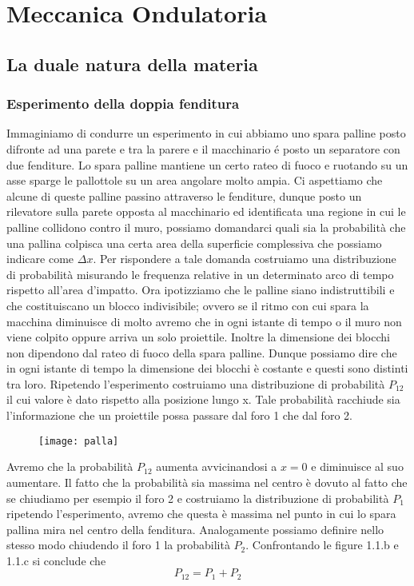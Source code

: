 \setcounter{chapter}{0}
\chapter{Meccanica Ondulatoria}
\section{La duale natura della materia}

\subsection{Esperimento della doppia fenditura}
Immaginiamo di condurre un esperimento in cui abbiamo uno spara palline posto difronte ad una parete e tra la parere e il macchinario \'e posto un separatore con due fenditure. Lo spara palline mantiene un certo rateo di fuoco e ruotando su un asse sparge le pallottole su un area angolare molto ampia. Ci aspettiamo che alcune di queste palline passino attraverso le fenditure, dunque posto un rilevatore sulla parete opposta al macchinario ed identificata una regione in cui le palline collidono contro il muro, possiamo domandarci quali sia la probabilit\`a che una pallina colpisca una certa area della superficie complessiva che possiamo indicare come $\Delta x$. Per rispondere a tale domanda costruiamo una distribuzione di probabilit\`a misurando le frequenza relative in un determinato arco di tempo rispetto all'area d'impatto. Ora ipotizziamo che le palline siano indistruttibili e che costituiscano un blocco indivisibile; ovvero se il ritmo con cui spara la macchina diminuisce di molto avremo che in ogni istante di tempo o il muro non viene colpito oppure arriva un solo proiettile. Inoltre la dimensione dei blocchi non dipendono dal rateo di fuoco della spara palline. Dunque possiamo dire che in ogni istante di tempo la dimensione dei blocchi \`e costante e questi sono distinti tra loro. Ripetendo l'esperimento costruiamo una distribuzione di probabilit\`a $P_{12}$ il cui valore \`e dato rispetto alla posizione lungo x. Tale probabilit\`a racchiude sia l'informazione che un proiettile possa passare dal foro 1 che dal foro 2.

 \begin{figure}[!ht]
\vspace{0.1in}
\texttt{[image: palla]}	
\centering
\vspace{0.1in}
\caption{}
\end{figure}

\noindent Avremo che la probabilit\`a $P_{12}$ aumenta avvicinandosi a $x = 0$ e diminuisce al suo aumentare. Il fatto che la probabilit\`a sia massima nel centro \`e dovuto al fatto che se chiudiamo per esempio il foro 2 e costruiamo la distribuzione di probabilit\`{a} $P_1$ ripetendo l'esperimento, avremo che questa \`e massima nel punto in cui lo spara pallina mira nel centro della fenditura. Analogamente possiamo definire nello stesso modo chiudendo il foro 1 la probabilit\`{a} $P_2$. Confrontando le figure 1.1.b e 1.1.c si conclude che 
\begin{equation}
	P_{12} = P_1 + P_2
\end{equation}

